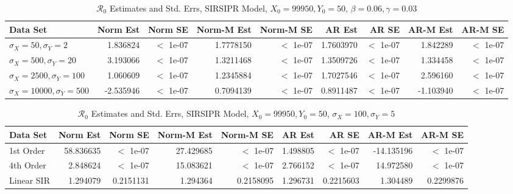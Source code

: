 \message{ !name(draft_v13.tex)}\documentclass[12pt]{article}
\newcommand{\rr}{\ensuremath{\mathcal{R}_0}}
\begin{document}
\begin{table}[H]
	
	\caption{\label{tab:}$\rr$ Estimates and Std. Errs, SIRSIPR Model,
		$X_0 = 99950, Y_0 = 50$, $\beta = 0.06, \gamma = 0.03$}
	\centering
	\begin{footnotesize}
		\begin{tabular}[t]{l|r|r|r|r|r|r|r|r}
			\hline
			Data Set & Norm Est & Norm SE & Norm-M Est & Norm-M SE & AR Est & AR SE & AR-M Est & AR-M SE\\
			\hline
			$\sigma_X = 50, \sigma_Y = 2$ & 1.836824 & $<$ 1e-07 & 1.7778150 & $<$ 1e-07 & 1.7603970 & $<$ 1e-07 & 1.842289 & $<$ 1e-07 \\
			\hline
			$\sigma_X = 500, \sigma_Y = 20$ & 3.193066 & $<$ 1e-07 & 1.3211468 & $<$ 1e-07 & 1.3509726 & $<$ 1e-07 & 1.334458 & $<$ 1e-07 \\
			\hline
			$\sigma_X = 2500, \sigma_Y = 100$ & 1.060609 & $<$ 1e-07 & 1.2345884 & $<$ 1e-07 & 1.7027546 & $<$ 1e-07 & 2.596160 & $<$ 1e-07 \\
			\hline
			$\sigma_X = 10000, \sigma_Y = 500$ & -2.535946 & $<$ 1e-07 & 0.7094139 & $<$ 1e-07 & 0.8911487 & $<$ 1e-07 & -1.103940 & $<$ 1e-07 \\
			\hline
		\end{tabular}
	\end{footnotesize}
\end{table}

\begin{table}[H]
	
	\caption{\label{tab:}$\rr$ Estimates and Std. Errs, SIRSIPR Model,
		$X_0 = 99950, Y_0 = 50$, $\sigma_X = 100, \sigma_Y = 5$}
	\centering
	\begin{footnotesize}
		\begin{tabular}[t]{l|r|r|r|r|r|r|r|r}
			\hline
			Data Set & Norm Est & Norm SE & Norm-M Est & Norm-M SE & AR Est & AR SE & AR-M Est & AR-M SE\\
			\hline
			1st Order & 58.836635 & $<$ 1e-07 & 27.429685 & $<$ 1e-07 & 1.498805 & $<$ 1e-07 & -14.135196 & $<$ 1e-07 \\
			\hline
			4th Order & 2.848624 & $<$ 1e-07 & 15.083621 & $<$ 1e-07 & 2.766152 & $<$ 1e-07 & 14.972580 & $<$ 1e-07 \\
			\hline
			Linear SIR & 1.294079 & 0.2151131 & 1.294364 & 0.2158095 & 1.296731 & 0.2215603 & 1.304489 & 0.2299876\\
			\hline
		\end{tabular}
	\end{footnotesize}
\end{table}
\end{document}

